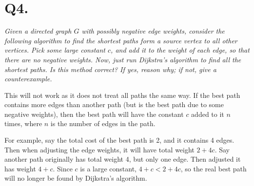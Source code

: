 \documentclass{article}
\begin{document}
\section*{Q4. }

\textit{Given a directed graph $G$ with possibly negative edge weights, consider the following algorithm to find the shortest paths form a source vertex to all other vertices. Pick some large constant $c$, and add it to the weight of each edge, so that there are no negative weights. Now, just run Dijkstra's algorithm to find all the shortest paths. Is this method correct? If yes, reason why; if not, give a counterexample.}

This will not work as it does not treat all paths the same way. If the best path contains more edges than another path (but is the best path due to some negative weights), then the best path will have the constant $c$ added to it $n$ times, where $n$ is the number of edges in the path.

For example, say the total cost of the best path is 2, and it contains 4 edges. Then when adjusting the edge weights, it will have total weight $2 + 4c$. Say another path originally has total weight 4, but only one edge. Then adjusted it has weight $4 + c$. Since $c$ is a large constant, $4+c < 2 + 4c$, so the real best path will no longer be found by Dijkstra's algorithm.
\end{document}
